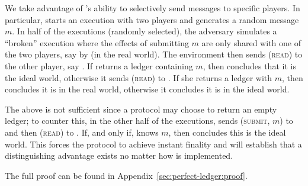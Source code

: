   \begin{proofsketch}
    We take advantage of \perfectadv's ability to selectively send messages to
    specific players. In particular, \perfectenv{} starts an execution with two
    players and generates a random message $m$. In half of the executions
    (randomly selected),  the adversary simulates a ``broken''  \perfectprot{}
    execution where the effects of submitting $m$ are only shared with one of
    the two players, say \alice{} by \perfectadv{} (in the real world). The
    environment then sends (\textsc{read}) to the other player, say \bob. If
    \bob{} returns a ledger containing $m$, then \perfectenv{} concludes that it
    is the ideal world, otherwise it sends (\textsc{read}) to \alice. If she
    returns a ledger with $m$, then \perfectenv{} concludes it is in the real
    world, otherwise it concludes it is in the ideal world.

    The above is not sufficient since a protocol may choose to return an empty
    ledger; to counter this, in the other half of the executions, \perfectenv{}
    sends (\textsc{submit}, $m$) to \alice{} and then (\textsc{read}) to \bob.
    If, and only if, \bob{} knows $m$, then \perfectenv{} concludes this is the
    ideal world. This forces the \perfectprot{} protocol to achieve instant
    finality and will establish that a distinguishing advantage exists no matter
    how \perfectprot{} is implemented.
  \end{proofsketch}

  The full proof can be found in Appendix~\ref{sec:perfect-ledger:proof}.
